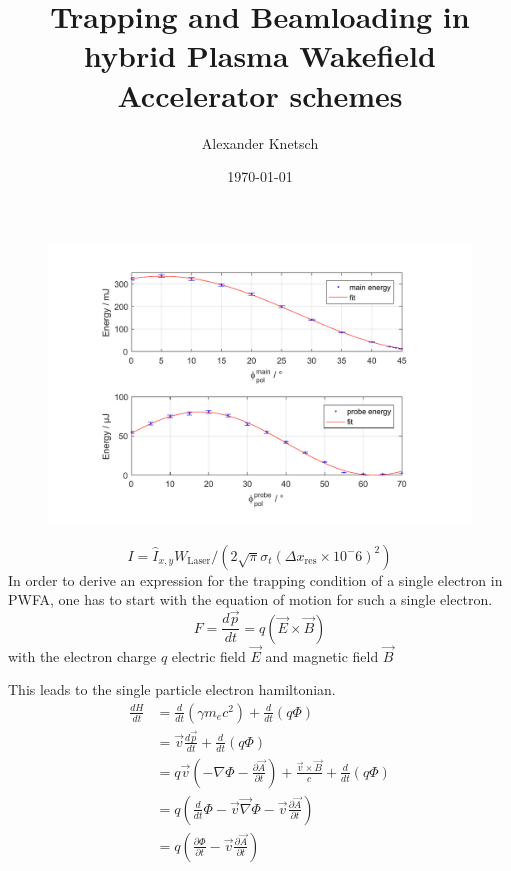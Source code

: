 \documentclass{thesis}
\title{Trapping and Beamloading in hybrid Plasma Wakefield Accelerator schemes}
\author{Alexander Knetsch}
\date{\today}
\begin{document}
\maketitle
\tableofcontents

\begin{figure}
\includegraphics[width=1.0\textwidth]{experiment/images/raw/waveplate_calibration.pdf}
\end{figure}


$$I=\hat{I}_{x,y}W_\mathrm{Laser}/(2\sqrt{\pi}\sigma_t(\Delta x_\mathrm{res}\times10^-6)^2)$$
In order to derive an expression for the trapping condition of a single electron in PWFA, one has to start with the equation of motion for such a single electron. 
\begin{equation}
F=\frac{d\vec{p}}{dt}=q(\vec{E}\times \vec{B})
\end{equation}
with the electron charge $q$ electric field $\vec{E}$ and magnetic field $\vec{B}$


This leads to the single particle electron hamiltonian. 
\begin{align}
\frac{dH}{dt}&=\frac{d}{dt} (\gamma m_e c^2)+\frac{d}{dt}(q\Phi)\\
&=\vec{v}\frac{d\vec{p}}{dt}+\frac{d}{dt}(q\Phi)\\
&=q\vec{v}(-\nabla \Phi-\frac{\partial \vec{A}}{\partial t})+\frac{\vec{v}\times\vec{B}}{c}+\frac{d}{dt}(q\Phi)\\
&=q(\frac{d}{dt}\Phi-\vec{v}\vec{\nabla}\Phi-\vec{v}\frac{\partial \vec{A}}{\partial t})\\
&=q(\frac{\partial \Phi}{\partial t}-\vec{v}\frac{\partial \vec{A}}{\partial t})
\end{align}
\end{document}
